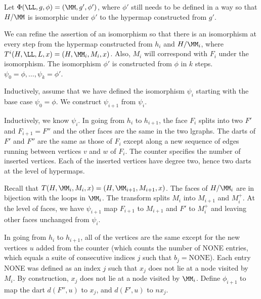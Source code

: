 \begin{lemma}
\begin{lemma}
Let $\Phi(\LL,g,\phi) = (\MM,g',\phi')$, where $\phi'$ still
needs to be defined in a way so that $H/\MM$ is isomorphic
under $\phi'$ to the hypermap constructed from $g'$.

We can refine the assertion of an isomorphism so that there is an
isomorphism at every step from the hypermap constructed from $h_i$ and $H/\MM_i$, where $T^i(H,\LL,L,x) = (H,\MM_i,M_i,x)$.  Also, $M_i$ will
correspond with $F_i$ under the isomorphism.  The isomorphism $\phi'$
is constructed from $\phi$ in $k$ steps.  $\psi_0 = \phi,\ldots,\psi_k
= \phi'$.


Inductively, assume that we have defined the isomorphism $\psi_i$
starting with the base case $\psi_0=\phi$.  We construct $\psi_{i+1}$
from $\psi_i$.  

Inductively, we know $\psi_i$.  In going from $h_i$ to $h_{i+1}$, the
face $F_i$ splits into two $F'$ and $F_{i+1}=F''$ and the other faces
are the same in the two lgraphs.  The darts of $F'$ and $F''$ are the
same as those of $F_i$ except along a new sequence of edges running
between vertices $v$ and $w$ of $F_i$.  The counter specifies the
number of inserted vertices.  Each of the inserted vertices have
degree two, hence two darts at the level of hypermaps.

Recall that  $T(H,\MM_i,M_i,x) = (H,\MM_{i+1},M_{i+1},x)$.  The
faces of $H/\MM_i$ are in bijection with the loops in $\MM_i$. 
The transform splits $M_i$ into $M_{i+1}$ and $M_i^+$.  At the level
of faces, we have $\psi_{i+1}$ map $F_{i+1}$ to $M_{i+1}$ and $F'$
to $M_i^+$ and leaving other faces unchanged from $\psi_i$.

In going from $h_i$ to $h_{i+1}$, all of the vertices are the same
except for the new vertices $u$ added from the counter (which counts
the number of NONE entries, which equals a suite of consecutive
indices $j$ such that $b_j = \text{NONE}$).  Each entry NONE was
defined as an index $j$ such that $x_j$ does not lie at a node visited
by $M_i$.  By construction, $x_j$ does not
lie at a node visited by $\MM_i$.  Define $\phi_{i+1}$ to map the dart
$d(F'',u)$ to $x_j$, and $d(F',u)$ to $n x_j$.


\end{lemma}
\end{lemma}
